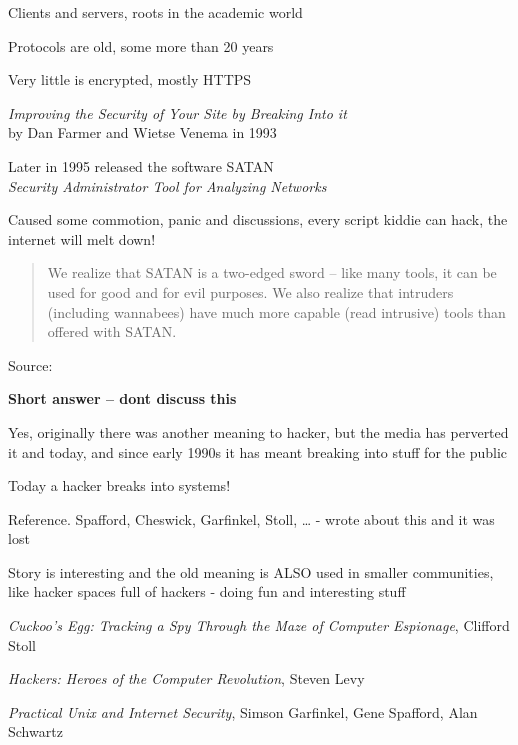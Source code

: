 \documentclass[Screen16to9,17pt]{foils}
\begin{document}
\hlkprofiluk



\begin{list1}
\item Clients and servers, roots in the academic world
\item Protocols are old, some more than 20 years
\item Very little is encrypted, mostly HTTPS
\end{list1}



\begin{list1}
\item \emph{Improving the Security of Your Site by Breaking Into it}\\ by
Dan Farmer and Wietse Venema in 1993
\item Later in 1995 released the software SATAN\\
\emph{Security Administrator Tool for Analyzing Networks}
\item Caused some commotion, panic and discussions, every script kiddie can hack, the internet will melt down!
\vskip 5mm
\begin{quote}
We realize that SATAN is a two-edged sword -- like
many tools, it can be used for good and for evil
purposes. We also realize that intruders (including
wannabees) have much more capable (read intrusive)
tools than offered with SATAN.
\end{quote}
\end{list1}

\vskip 1cm
Source:





{\bfseries Short answer -- dont discuss this}

Yes, originally there was another meaning to hacker, but the media has perverted it and today, and since early 1990s it has meant breaking into stuff for the public

{\color{red}\hlkbig Today a hacker breaks into systems!}

Reference. Spafford, Cheswick, Garfinkel, Stoll, \ldots
- wrote about this and it was lost

Story is interesting and the old meaning is ALSO used in smaller communities, like hacker spaces full of hackers - doing fun and interesting stuff
\begin{list2}
\item \emph{Cuckoo's Egg: Tracking a Spy Through the Maze of Computer
 Espionage},  Clifford Stoll
\item \emph{Hackers: Heroes of the Computer Revolution},
Steven Levy
\item \emph{Practical Unix and Internet Security},
Simson Garfinkel, Gene Spafford, Alan Schwartz
\end{list2}
\end{document}
